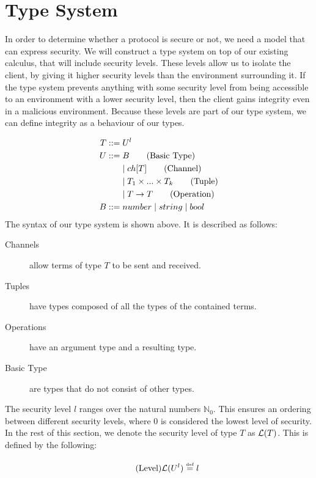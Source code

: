 \section{Type System}\label{ch:type-security}
In order to determine whether a protocol is secure or not, we need a model that can express security.
We will construct a type system on top of our existing calculus, that will include security levels.
These levels allow us to isolate the client, by giving it higher security levels than the environment surrounding it.
If the type system prevents anything with some security level from being accessible to an environment with a lower security level, then the client gains integrity even in a malicious environment.
Because these levels are part of our type system, we can define integrity as a behaviour of our types.

\begin{align*}
T::=&\;U^l\\    	
U::=&\;B \tag{Basic Type}\\
&\mid ch[T] \tag{Channel}\\
&\mid T_1 \times...\times T_k \tag{Tuple}\\
&\mid T\rightarrow T \tag{Operation}\\
B::=&\;number 
\mid string
\mid bool\\
\end{align*}
The syntax of our type system is shown above. It is described as follows:

\begin{description}
	\item[Channels] allow terms of type $T$ to be sent and received.
	\item[Tuples] have types composed of all the types of the contained terms.
	\item[Operations] have an argument type and a resulting type.
	\item[Basic Type] are types that do not consist of other types.
\end{description}

The security level $l$ ranges over the natural numbers $\mathbb{N}_0$.
This ensures an ordering between different security levels, where $0$ is considered the lowest level of security.
In the rest of this section, we denote the security level of type $T$ as $\mathcal{L}(T)$.
This is defined by the following:

\begin{align*}
\tag{Level}\mathcal{L}(U^l)\overset{\underset{\mathrm{def}}{}}{=} l
\end{align*}

